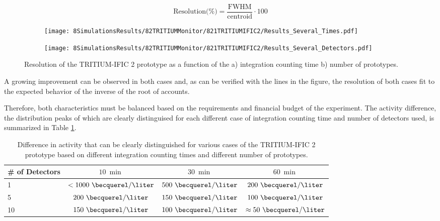 \begin{equation}
\text{Resolution(\%)}=\frac{\text{FWHM}}{\text{centroid}}\cdot{}100
\label{eq:Resolution}
\end{equation}

\begin{figure}
\centering
    \begin{subfigure}[b]{0.45\textwidth}
    \centering
    \texttt{[image: 8SimulationsResults/82TRITIUMMonitor/821TRITIUMIFIC2/Results\_Several\_Times.pdf]}  
    \caption{\label{subfig:ResolutionvsIntegrationCoutingTime}}
    \end{subfigure}
    \hfill
    \begin{subfigure}[b]{0.45\textwidth}
    \centering
    \texttt{[image: 8SimulationsResults/82TRITIUMMonitor/821TRITIUMIFIC2/Results\_Several\_Detectors.pdf]}  
    \caption{\label{subfig:ResolutionvsNumberDetectors}}
    \end{subfigure}
 \caption{Resolution of the TRITIUM-IFIC 2 prototype as a function of the a) integration counting time b) number of prototypes.}
 \label{fig:Resolution}
\end{figure}

A growing improvement can be observed in both cases and, as can be verified with the lines in the figure, the resolution of both cases fit to the expected behavior of the inverse of the root of accounts.

Therefore, both characteristics must be balanced based on the requirements and financial budget of the experiment. The activity difference, the distribution peaks of which are clearly distinguised for each different case of integration counting time and number of detectors used, is summarized in Table \ref{tab:DifferentCasesOfTI2}.

\begin{table}[htbp]
\centering{}%
\begin{tabular}{lccc}
\toprule 
\# of Detectors & $10~\min$ & $30~\min$ & $60~\min$ \tabularnewline
\midrule
\midrule 
1 & $<1000~\becquerel/\liter$ & $500~\becquerel/\liter$ & $200~\becquerel/\liter$ \tabularnewline
5 & $200~\becquerel/\liter$ & $150~\becquerel/\liter$ & $100~\becquerel/\liter$ \tabularnewline
10 & $150~\becquerel/\liter$ & $100~\becquerel/\liter$ & $\approx 50~\becquerel/\liter$ \tabularnewline
\bottomrule
\end{tabular}
\caption{Difference in activity that can be clearly distinguished for various cases of the TRITIUM-IFIC 2 prototype based on different integration counting times and different number of prototypes.}
\label{tab:DifferentCasesOfTI2}
\end{table}

